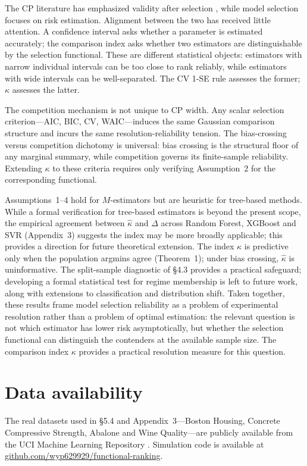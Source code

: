 \documentclass[lineno]{biometrika}
\begin{document}
The CP literature has emphasized validity after selection \citep{Yang:2024,Hegazy:2025,Liang:2026}, while model selection focuses on risk estimation. Alignment between the two has received little attention. A confidence interval asks whether a parameter is estimated accurately; the comparison index asks whether two estimators are distinguishable by the selection functional. These are different statistical objects: estimators with narrow individual intervals can be too close to rank reliably, while estimators with wide intervals can be well-separated. The CV 1-SE rule \citep{Hastie:2009} assesses the former; $\kappa$ assesses the latter.

The competition mechanism is not unique to CP width. Any scalar selection criterion---AIC, BIC, CV, WAIC---induces the same Gaussian comparison structure and incurs the same resolution-reliability tension. The bias-crossing versus competition dichotomy is universal: bias crossing is the structural floor of any marginal summary, while competition governs its finite-sample reliability. Extending $\kappa$ to these criteria requires only verifying Assumption~2 for the corresponding functional.

Assumptions~1--4 hold for $M$-estimators but are heuristic for tree-based methods. While a formal verification for tree-based estimators is beyond the present scope, the empirical agreement between $\hat\kappa$ and $\Delta$ across Random Forest, XGBoost and SVR (Appendix~3) suggests the index may be more broadly applicable; this provides a direction for future theoretical extension. The index $\kappa$ is predictive only when the population argmins agree (Theorem~1); under bias crossing, $\hat\kappa$ is uninformative. The split-sample diagnostic of \S4.3 provides a practical safeguard; developing a formal statistical test for regime membership is left to future work, along with extensions to classification and distribution shift. Taken together, these results frame model selection reliability as a problem of experimental resolution rather than a problem of optimal estimation: the relevant question is not which estimator has lower risk asymptotically, but whether the selection functional can distinguish the contenders at the available sample size. The comparison index $\kappa$ provides a practical resolution measure for this question.

\section*{Data availability}
The real datasets used in \S5.4 and Appendix~3---Boston Housing, Concrete Compressive Strength, Abalone and Wine Quality---are publicly available from the UCI Machine Learning Repository \citep[\href{https://archive.ics.uci.edu}{https://archive.ics.uci.edu}]{UCI:2025}.  Simulation code is available at \href{https://github.com/wyp629929/A-comparison-index-for-functional-ranking-in-model-selection}{github.com/wyp629929/functional-ranking}.
\end{document}
